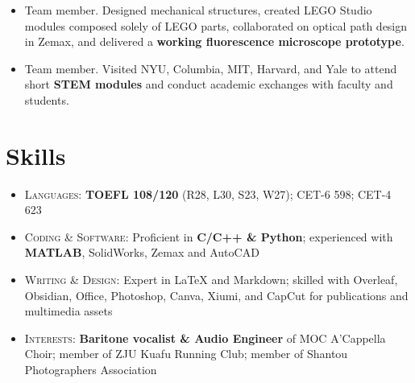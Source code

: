 \documentclass{resume}
\begin{document}
\begin{itemize}[parsep=0.5ex]
  \item Team member. Designed mechanical structures, created LEGO Studio modules composed solely of LEGO parts, collaborated on optical path design in Zemax, and delivered a \textbf{working fluorescence microscope prototype}.
\end{itemize}

\begin{itemize}[parsep=0.5ex]
\item Team member. Visited NYU, Columbia, MIT, Harvard, and Yale to attend short \textbf{STEM modules} and conduct academic exchanges with faculty and students.
\end{itemize}

\section{Skills}
\begin{itemize}[parsep=0.5ex]
  \item \textsc{Languages}: \textbf{TOEFL 108/120} (R28, L30, S23, W27); CET-6 598; CET-4 623
  \item \textsc{Coding \& Software}: Proficient in \textbf{C/C++ \& Python}; experienced with \textbf{MATLAB}, SolidWorks, Zemax and AutoCAD
  \item \textsc{Writing \& Design}: Expert in LaTeX and Markdown; skilled with Overleaf, Obsidian, Office, Photoshop, Canva, Xiumi, and CapCut for publications and multimedia assets
  \item \textsc{Interests}: \textbf{Baritone vocalist \& Audio Engineer} of MOC A'Cappella Choir; member of ZJU Kuafu Running Club; member of Shantou Photographers Association
\end{itemize}
\end{document}
